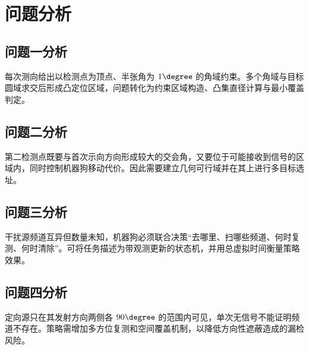 \section{问题分析}

\subsection{问题一分析}
每次测向给出以检测点为顶点、半张角为 \(1\degree\) 的角域约束。多个角域与目标圆域求交后形成凸定位区域，问题转化为约束区域构造、凸集直径计算与最小覆盖判定。

\subsection{问题二分析}
第二检测点既要与首次示向方向形成较大的交会角，又要位于可能接收到信号的区域内，同时控制机器狗移动代价。因此需要建立几何可行域并在其上进行多目标选址。

\subsection{问题三分析}
干扰源频道互异但数量未知，机器狗必须联合决策“去哪里、扫哪些频道、何时复测、何时清除”。可将任务描述为带观测更新的状态机，并用总虚拟时间衡量策略效果。

\subsection{问题四分析}
定向源只在其发射方向两侧各 \(90\degree\) 的范围内可见，单次无信号不能证明频道不存在。策略需增加多方位复测和空间覆盖机制，以降低方向性遮蔽造成的漏检风险。
